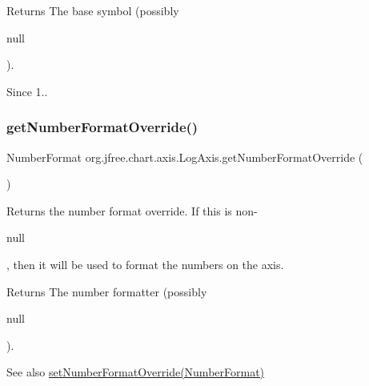 \begin{DoxyReturn}{Returns}
The base symbol (possibly
\begin{DoxyCode}
null 
\end{DoxyCode}
 ).
\end{DoxyReturn}
\begin{DoxySince}{Since}
1.. 
\end{DoxySince}
\mbox{\label{classorg_1_1jfree_1_1chart_1_1axis_1_1_log_axis_abfe91c2add4820043db00e299893f7ed}} 
\subsubsection{\texorpdfstring{get\+Number\+Format\+Override()}{getNumberFormatOverride()}}
{\footnotesize\ttfamily Number\+Format org.\+jfree.\+chart.\+axis.\+Log\+Axis.\+get\+Number\+Format\+Override (\begin{DoxyParamCaption}{ }\end{DoxyParamCaption})}

Returns the number format override. If this is non-\/
\begin{DoxyCode}
null 
\end{DoxyCode}
 , then it will be used to format the numbers on the axis.

\begin{DoxyReturn}{Returns}
The number formatter (possibly
\begin{DoxyCode}
null 
\end{DoxyCode}
 ).
\end{DoxyReturn}
\begin{DoxySeeAlso}{See also}
\mbox{\hyperlink{classorg_1_1jfree_1_1chart_1_1axis_1_1_log_axis_a6c15f9a9f7b92544be4244bd4df8622b}{set\+Number\+Format\+Override(\+Number\+Format)}} 
\end{DoxySeeAlso}
\mbox{\label{classorg_1_1jfree_1_1chart_1_1axis_1_1_log_axis_a790a3c747f54b4082793c83b4321cd13}} 
